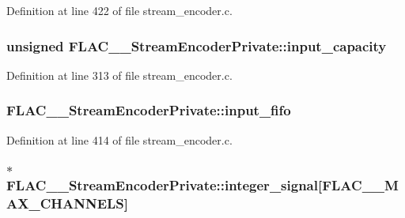 Definition at line 422 of file stream\+\_\+encoder.\+c.

\subsubsection[{\texorpdfstring{input\+\_\+capacity}{input_capacity}}]{\setlength{\rightskip}{0pt plus 5cm}unsigned F\+L\+A\+C\+\_\+\+\_\+\+Stream\+Encoder\+Private\+::input\+\_\+capacity}\hypertarget{struct_f_l_a_c_____stream_encoder_private_a4ba9a381341354ab7661ddaaa472ee95}{}\label{struct_f_l_a_c_____stream_encoder_private_a4ba9a381341354ab7661ddaaa472ee95}


Definition at line 313 of file stream\+\_\+encoder.\+c.

\subsubsection[{\texorpdfstring{input\+\_\+fifo}{input_fifo}}]{ F\+L\+A\+C\+\_\+\+\_\+\+Stream\+Encoder\+Private\+::input\+\_\+fifo}\hypertarget{struct_f_l_a_c_____stream_encoder_private_ad80c8f346753a568b548c3aca302a23d}{}\label{struct_f_l_a_c_____stream_encoder_private_ad80c8f346753a568b548c3aca302a23d}


Definition at line 414 of file stream\+\_\+encoder.\+c.

\subsubsection[{\texorpdfstring{integer\+\_\+signal}{integer_signal}}]{$\ast$ F\+L\+A\+C\+\_\+\+\_\+\+Stream\+Encoder\+Private\+::integer\+\_\+signal\mbox{[}{\bf F\+L\+A\+C\+\_\+\+\_\+\+M\+A\+X\+\_\+\+C\+H\+A\+N\+N\+E\+LS}\mbox{]}}\hypertarget{struct_f_l_a_c_____stream_encoder_private_a2fd6ac71c302942508089c914e4a107b}{}\label{struct_f_l_a_c_____stream_encoder_private_a2fd6ac71c302942508089c914e4a107b}


